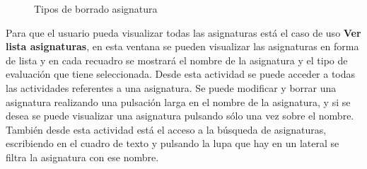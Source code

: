 \begin{figure}
 \centering
 \caption{Tipos de borrado asignatura}
 \label{f:Tipos de borrado asignatura}
\end{figure}

Para que el usuario pueda visualizar todas las asignaturas está el caso de uso \textbf{Ver lista asignaturas}, en esta ventana se pueden visualizar las asignaturas en forma de lista y en cada recuadro se mostrará el nombre de la asignatura y el tipo de evaluación que tiene seleccionada.
Desde esta actividad se puede acceder a todas las actividades referentes a una asignatura. Se puede modificar y borrar una asignatura realizando una pulsación larga en el nombre de la asignatura, y si se desea se puede visualizar una asignatura pulsando sólo una vez sobre el nombre.
También desde esta actividad está el acceso a la búsqueda de asignaturas, escribiendo en el cuadro de texto y pulsando la lupa que hay en un lateral se filtra la asignatura con ese nombre.


